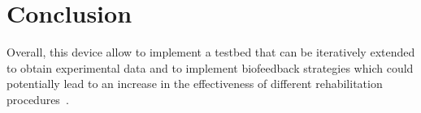 \documentclass[conference]{IEEEtran}
\begin{document}


\section*{Conclusion}
Overall, this device allow to implement a testbed that can be iteratively extended to obtain experimental data and to implement biofeedback strategies which could potentially lead to an increase in the effectiveness of different rehabilitation procedures~\cite{Bowman2021}.




%
%
%
\end{document}
